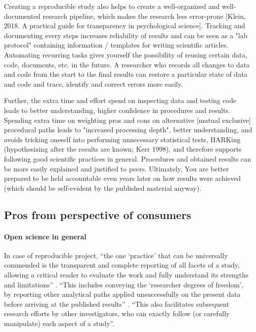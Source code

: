 Creating a reproducible study also helps to create a well-organized and
well-documented research pipeline, which makes the research less error-prone
[Klein, 2018. A practical guide for transparency in psychological science].
%
Tracking and documenting every steps increases reliability of results and can be
seen as a "lab protocol" containing information / templates for writing
scientific articles.
%
Automating recurring tasks gives yourself the possibility of reusing certain
data, code, documents, etc. in the future.
%
A researcher who records all changes to data and code from the start to the
final results can restore a particular state of data and code and trace,
identify and correct errors more easily.


%
Further, the extra time and effort spend on inspecting data and testing code
leads to better understanding, higher confidence in procedures and results.
%
Spending extra time on weighting pros and cons on alternative [mutual exclusive]
procedural paths leads to "increased processing depth", better understanding,
and avoids tricking oneself into performing unnecessary statistical tests,
HARKing (hypothesizing after the results are known; Kerr 1998), and therefore
supports following good scientific practices in general.
%
Procedures and obtained results can be more easily explained and justified to
peers.
%
Ultimately, You are better prepared to be held accountable even years later on
how results were achieved (which should be self-evident by the published
material anyway).


\subsection{Pros from perspective of consumers}


\paragraph{Open science in general}

%
In case of reproducible project, ``the one ‘practice’ that can be universally
commended is the transparent and complete reporting of all facets of a study,
allowing a critical reader to evaluate the work and fully understand its
strengths and limitations'' \citep{nichols2017best}.
%
``This includes conveying the ‘researcher degrees of freedom’, by reporting
other analytical paths applied unsuccessfully on the present data before
arriving at the published results'' \citep{nichols2017best}.
%
``This also facilitates subsequent research efforts by other investigators, who
can exactly follow (or carefully manipulate) each aspect of a study''.

